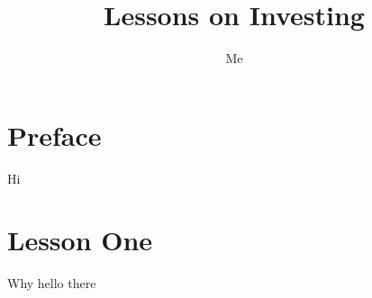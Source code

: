 \documentclass[onecolumn]{article}
\begin{document}
\title{Lessons on Investing}

\predate{}
\postdate{}
\date{}




\author{Me}
\maketitle
\thispagestyle{empty}
\clearpage{}


\thispagestyle{empty}
\renewcommand{\contentsname}{\centering Contents} %
\tableofcontents
\newpage

\section*{\centering Preface}

Hi

\clearpage{}

\section*{\centering Lesson One}
Why hello there


\printbibliography
\end{document}
